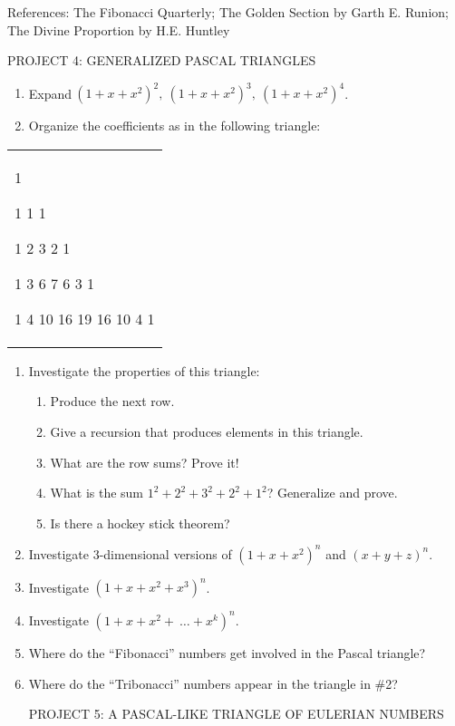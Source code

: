 \documentclass[10pt,letter]{article}
\renewenvironment{quote}
  {\begin{tabular}{|p{13cm}}}
  {\end{tabular}}
\begin{document}
References: The Fibonacci Quarterly; The Golden Section by Garth E.
Runion; The Divine Proportion by H.E. Huntley

PROJECT 4: GENERALIZED PASCAL TRIANGLES
\begin{enumerate}
\def\labelenumi{\arabic{enumi}.}

\item
  Expand\({\ \left( 1 + x + x^{2} \right)}^{2},\ \left( 1 + x + x^{2} \right)^{3},\ \left( 1 + x + x^{2} \right)^{4}\).
\item
  Organize the coefficients as in the following triangle:

\end{enumerate}
\begin{quote}
1

1 1 1

1 2 3 2 1

1 3 6 7 6 3 1

1 4 10 16 19 16 10 4 1

\end{quote}
\begin{enumerate}
\def\labelenumi{\arabic{enumi}.}

\item
  Investigate the properties of this triangle:
\begin{enumerate}
  \def\labelenumii{\alph{enumii}.}

  \item
    Produce the next row.
  \item
    Give a recursion that produces elements in this triangle.
  \item
    What are the row sums? Prove it!
  \item
    What is the sum \(1^{2} + 2^{2} + 3^{2} + 2^{2} + 1^{2}\)?
    Generalize and prove.
  \item
    Is there a hockey stick theorem?

\end{enumerate}
\item
  Investigate 3-dimensional versions of
  \(\left( 1 + x + x^{2} \right)^{n}\) and
  \(\left( x + y + z \right)^{n}.\)
\item
  Investigate \(\left( 1 + x + x^{2} + x^{3} \right)^{n}\).
\item
  Investigate \(\left( 1 + x + x^{2} + \ \ldots + x^{k} \right)^{n}\).
\item
  Where do the ``Fibonacci'' numbers get involved in the Pascal
  triangle?
\item
  Where do the ``Tribonacci'' numbers appear in the triangle in \#2?

PROJECT 5: A PASCAL-LIKE TRIANGLE OF EULERIAN NUMBERS

\end{enumerate}
\end{document}
